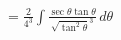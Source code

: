\documentclass[preview]{standalone}
\begin{document}
\begin{align*}
&=\frac{2}{4^3} \int \frac{\sec\theta\tan\theta}{\sqrt{\tan^2\theta}^3} \, d\theta \\
\end{align*}
\end{document}
